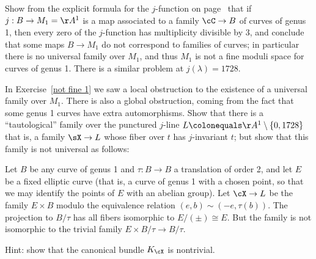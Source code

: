 \begin{exercise}\label{not fine 1}
Show from the explicit formula for the 
%
$j$-function
on page~\pageref{formula for j}
that if $j : B \to M_1 = \AA^1$ is a
map  associated to a family $\cC \to B$ of curves of genus 1, then
every zero of the $j$-function has multiplicity divisible by 3, and
conclude that some maps $B\to M_1$ do not correspond to families of
curves; in particular there is no universal family over $M_1$, and
thus $M_1$ is not a fine moduli space for curves
of genus 1. There is a similar problem at $j(\lambda)=1728$.
\end{exercise}

\begin{exercise}\label{not fine 2}
In Exercise~\ref{not fine 1} we saw a local obstruction to the
existence of a universal family over $M_1$. There is also a global
obstruction, coming from the fact that some genus 1 curves have extra
automorphisms. Show that there is a ``tautological'' family over the
punctured $j$-line $L \colonequals  \AA^1\setminus \{0,1728\}$\emdash
that is, a family
$\sX \to L$ whose fiber over $t$ has $j$-invariant $t$; but show that this family is not universal as follows:

Let $B$ be any curve of genus 1 and $\tau : B \to B$ a translation of
order 2, and let $E$ be a fixed 
elliptic curve
%
(that is, a curve of
genus 1 with a chosen point, so that we may identify the points of $E$
with an abelian group). 
Let $\cX\to L$ be the family $E\times B$ modulo the equivalence relation $(e,b) \sim (-e, \tau(b))$.
The projection to $B/\tau$ has all fibers isomorphic to $E/(\pm) \cong E$. But the family is not
isomorphic to the trivial family $E\times B/\tau \to B/\tau$.

Hint: show that the canonical bundle $K_\cX$ is nontrivial.
\end{exercise}

